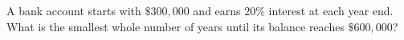 A bank account starts with $\$300{,}000$ and earns $20\%$ interest at each year end. What is the smallest whole number of years until its balance reaches $\$600{,}000$?
